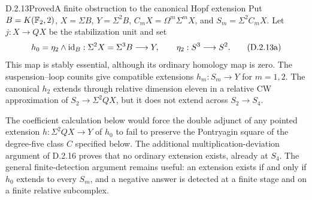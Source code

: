 \begin{claim}{D.2.13}{Proved}{A finite obstruction to the canonical Hopf extension}
Put $B=K(\mathbb F_2,2)$, $X=\Sigma B$, $Y=\Sigma^2B$,
$C_mX=\Omega^m\Sigma^mX$, and $S_m=\Sigma^2C_mX$.
Let $j:X\to QX$ be the stabilization unit and set
\[
 h_0=\eta_2\wedge\mathrm{id}_B:\Sigma^2X=\Sigma^3B\longrightarrow Y,
 \qquad \eta_2:S^3\longrightarrow S^2.
 \tag{D.2.13a}
\]
This map is stably essential, although its ordinary homology map is zero.
The suspension--loop counits give compatible extensions $h_m:S_m\to Y$
for $m=1,2$. The canonical $h_2$ extends through relative dimension
eleven in a relative CW approximation of $S_2\to\Sigma^2QX$,
but it does not extend across $S_2\to S_4$.

The coefficient calculation below would force the double adjunct of
any pointed extension $h:\Sigma^2QX\to Y$ of $h_0$ to fail to
preserve the Pontryagin square of the degree-five class $C$ specified
below. The additional multiplication-deviation argument of D.2.16
proves that no ordinary extension exists, already at $S_4$.
The general finite-detection argument remains useful: an extension
exists if and only if $h_0$ extends to every $S_m$, and a negative
answer is detected at a finite stage and on a finite relative subcomplex.
\end{claim}
